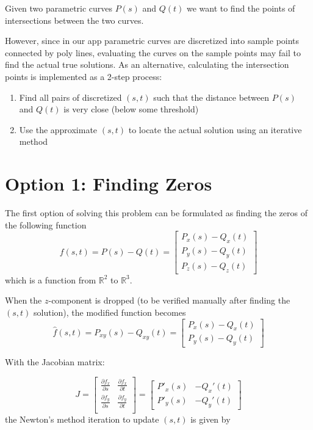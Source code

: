 \documentclass[11pt]{article}
\begin{document}
Given two parametric curves $P(s)$ and $Q(t)$ we want to find the points of intersections
between the two curves.

However, since in our app parametric curves are discretized into sample points connected by poly lines, evaluating the curves
on the sample points may fail to find the actual true solutions. As an alternative, calculating the intersection
points is implemented as a 2-step process:

\begin{enumerate}
  \item Find all pairs of discretized $(s,t)$ such that the distance between $P(s)$ and $Q(t)$ is very close (below some threshold)
  \item Use the approximate $(s,t)$ to locate the actual solution using an iterative method
\end{enumerate}

\section*{Option 1: Finding Zeros}
The first option of solving this problem can be formulated as finding the zeros of the following function
$$f(s,t) = P(s) - Q(t) = \begin{bmatrix}
    P_x(s) - Q_x(t) \\
    P_y(s) - Q_y(t) \\
    P_z(s) - Q_z(t)
  \end{bmatrix}$$
which is a function from $\mathbb{R}^2$ to $\mathbb{R}^3$.

When the $z$-component is dropped (to be verified manually after finding the $(s,t)$ solution),
the modified function becomes
$$\hat f(s,t) = P_{xy}(s) - Q_{xy}(t) = \begin{bmatrix}
    P_x(s) - Q_x(t) \\
    P_y(s) - Q_y(t)
  \end{bmatrix}$$

With the Jacobian matrix:

$$
  J =
  \begin{bmatrix}
    \frac{\partial f_x}{\partial s} & \frac{\partial f_x}{\partial t} \\
    \frac{\partial f_y}{\partial s} & \frac{\partial f_y}{\partial t} \\
  \end{bmatrix}
  =
  \begin{bmatrix}
    P'_x(s) & -Q_x'(t) \\
    P'_y(s) & -Q_y'(t)
  \end{bmatrix}
$$
the Newton's method iteration to update $(s,t)$ is given by
\end{document}
